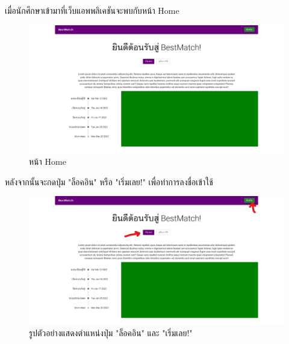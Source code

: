 %
เมื่อนักศึกษาเข้ามาที่เว็บแอพพลิเคชันจะพบกับหน้า Home
\begin{figure}[h]
  \begin{center}
    \includegraphics[width=\linewidth]{photo/web/student/home.jpeg}
  \end{center}
  \caption{หน้า Home}
\end{figure}
%
\newline
หลังจากนั้นจะกดปุ่ม "ล็อคอิน" หรือ "เริ่มเลย!" เพื่อทำการลงชื่อเข้าใช้
\begin{figure}[ht]
  \begin{center}
    \includegraphics[width=\linewidth]{photo/web/student/login-btn.jpeg}
  \end{center}
  \caption{รูปตัวอย่างแสดงตำแหน่งปุ่ม "ล็อคอิน" และ "เริ่มเลย!"}
\end{figure}
\newpage 


